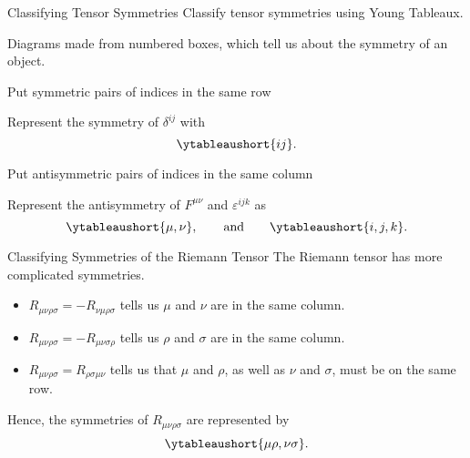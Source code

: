 \documentclass{beamer}
\newcommand{\define}[1]{\alert{#1}}
\begin{document}
    \begin{frame}{Classifying Tensor Symmetries}
        Classify tensor symmetries using \define{Young Tableaux}.
        
        Diagrams made from numbered boxes, which tell us about the symmetry of an object.
        
        \pause
        Put symmetric pairs of indices in the same row
        
        Represent the symmetry of \(\delta^{ij}\) with
        \begin{equation*}
            \ytableaushort{ij}.
        \end{equation*}
        
        \pause
        Put antisymmetric pairs of indices in the same column
        
        Represent the antisymmetry of \(F^{\mu\nu}\) and \(\varepsilon^{ijk}\) as
        \begin{equation*}
            \ytableaushort{\mu,\nu}, \qquad\text{and}\qquad \ytableaushort{i,j,k}.
        \end{equation*}
    \end{frame}
    
    \begin{frame}{Classifying Symmetries of the Riemann Tensor}
        The Riemann tensor has more complicated symmetries.
        \begin{itemize}
            \item \(R_{\mu\nu\rho\sigma} = -R_{\nu\mu\rho\sigma}\) tells us \(\mu\) and \(\nu\) are in the same column.
            \item \(R_{\mu\nu\rho\sigma} = -R_{\mu\nu\sigma\rho}\) tells us \(\rho\) and \(\sigma\) are in the same column.
            \item \(R_{\mu\nu\rho\sigma} = R_{\rho\sigma\mu\nu}\) tells us that \(\mu\) and \(\rho\), as well as \(\nu\) and \(\sigma\), must be on the same row.
        \end{itemize}
        \pause
        Hence, the symmetries of \(R_{\mu\nu\rho\sigma}\) are represented by
        \begin{equation*}
            \ytableaushort{\mu\rho,\nu\sigma}.
        \end{equation*}
    \end{frame}
    
\end{document}
